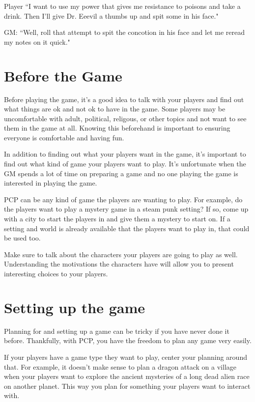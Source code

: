 \begin{flushleft}
Player ``I want to use my power that gives me resistance to poisons and take a
drink. Then I'll give Dr. Eeevil a thumbs up and spit some in his face."

GM: ``Well, roll that attempt to spit the concotion in his face and let me
reread my notes on it quick."

\section*{Before the Game}

Before playing the game, it's a good idea to talk with your players and find out
what things are ok and not ok to have in the game. Some players may be
uncomfortable with adult, political, religous, or other topics and not want to
see them in the game at all. Knowing this beforehand is important to ensuring
everyone is comfortable and having fun.

In addition to finding out what your players want in the game, it's important
to find out what kind of game your players want to play. It's unfortunate when
the GM spends a lot of time on preparing a game and no one playing the game
is interested in playing the game.

PCP can be any kind of game the players are wanting to play. For example, do
the players want to play a mystery game in a steam punk setting? If so, come up
with a city to start the players in and give them a mystery to start on.
If a setting and world is already available that the players want to play in,
that could be used too.

Make sure to talk about the characters your players are going to play as well.
Understanding the motivations the characters have will allow you to present
interesting choices to your players.

\section*{Setting up the game}

Planning for and setting up a game can be tricky if you have never done it
before. Thankfully, with PCP, you have the freedom to plan any game very
easily.

If your players have a game type they want to play, center your planning around
that. For example, it doesn't make sense to plan a dragon attack on a village
when your players want to explore the ancient mysteries of a long dead alien
race on another planet. This way you plan for something your players want to
interact with.


\end{flushleft}
